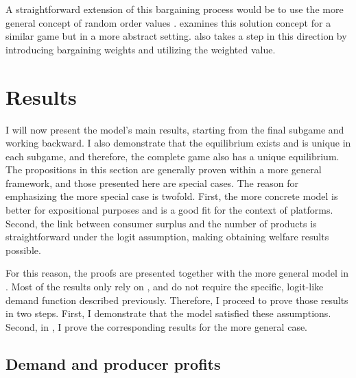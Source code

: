 A straightforward extension of this bargaining process would be to use the more general concept of random order values \parencite{weber1988probabilistic}.
\theoryref{} examines this solution concept for a similar game but in a more abstract setting.
 also takes a step in this direction by introducing bargaining weights and utilizing the weighted value.
\section{Results}
\label{sec:results}

I will now present the model's main results, starting from the final subgame and working backward.
I also demonstrate that the equilibrium exists and is unique in each subgame, and therefore, the complete game also has a unique equilibrium.
The propositions in this section are generally proven within a more general framework, and those presented here are special cases.
The reason for emphasizing the more special case is twofold.
First, the more concrete model is better for expositional purposes and is a good fit for the context of platforms.
Second, the link between consumer surplus and the number of products is straightforward under the logit assumption, making obtaining welfare results possible.

For this reason, the proofs are presented together with the more general model in .
Most of the results only rely on , and do not require the specific, logit-like demand function described previously.
Therefore, I proceed to prove those results in two steps.
First, I demonstrate that the model satisfied these assumptions.
Second, in , I prove the corresponding results for the more general case.

\subsection{Demand and producer profits}
\label{sec:results_demand}

